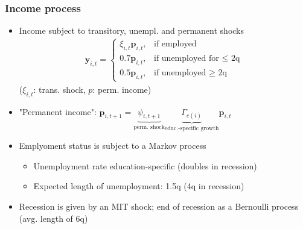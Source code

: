\documentclass[pdflatex,aspectratio=169]{beamer}
\begin{document}
\begin{frame}
\frametitle{ Income process}

	\begin{itemize}

		\item Income subject to transitory, unempl. and permanent shocks
			\begin{align}
				\mathbf{y}_{i,t} =   \begin{cases}
				\xi_{i,t}\mathbf{p}_{i,t}, & \text{if employed} \\
				0.7 \mathbf{p}_{i,t}, & \text{if unemployed for $\leq$ 2q} \\
				0.5 \mathbf{p}_{i,t}, & \text{if unemployed $\ge$ 2q} 
				\end{cases}
			\end{align}
			($\xi_{i,t}$: trans. shock, $p$: perm. income)
			
		\item "Permanent income":  $\mathbf{p}_{i,t+1} = \underbrace{\psi_{i,t+1}}_{\text{perm. shock}} \underbrace{\Gamma_{e(i)}}_{\text{educ.-specific growth}}\mathbf{p}_{i,t}$ 


		\pause
		\bigskip
		\item Emplyoment status is subject to a Markov process
		\begin{itemize}
			\item Unemployment rate education-specific (doubles in recession)
			\item Expected length of unemployment: 1.5q  (4q in recession)
		\end{itemize}
		
		\item Recession is given by an MIT shock; end of recession as a Bernoulli process (avg. length of 6q)
		
	
	\end{itemize}

\end{frame}
\end{document}
